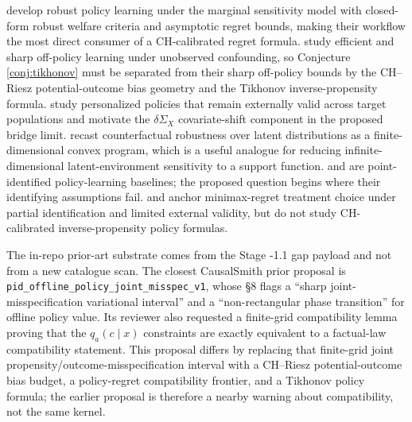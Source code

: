 \documentclass[11pt]{article}
\theoremstyle{definition}
\theoremstyle{plain}
\theoremstyle{remark}
\begin{document}
\citet{JinXuZhengZhou2025} develop robust policy learning under the marginal sensitivity model with closed-form robust welfare criteria and asymptotic regret bounds, making their workflow the most direct consumer of a CH-calibrated regret formula. \citet{HessFrauenMelnychukFeuerriegel2026} study efficient and sharp off-policy learning under unobserved confounding, so Conjecture \ref{conj:tikhonov} must be separated from their sharp off-policy bounds by the CH--Riesz potential-outcome bias geometry and the Tikhonov inverse-propensity formula. \citet{AdjahoChristensen2025} study personalized policies that remain externally valid across target populations and motivate the $\delta\Sigma_X$ covariate-shift component in the proposed bridge limit. \citet{ChristensenConnault2023} recast counterfactual robustness over latent distributions as a finite-dimensional convex program, which is a useful analogue for reducing infinite-dimensional latent-environment sensitivity to a support function. \citet{KitagawaTetenov2018} and \citet{AtheyWager2021} are point-identified policy-learning baselines; the proposed question begins where their identifying assumptions fail. \citet{Manski2004} and \citet{Stoye2012} anchor minimax-regret treatment choice under partial identification and limited external validity, but do not study CH-calibrated inverse-propensity policy formulas.

The in-repo prior-art substrate comes from the Stage -1.1 gap payload and not from a new catalogue scan. The closest CausalSmith prior proposal is \texttt{pid\_offline\_policy\_joint\_misspec\_v1}, whose \S8 flags a ``sharp joint-misspecification variational interval'' and a ``non-rectangular phase transition'' for offline policy value. Its reviewer also requested a finite-grid compatibility lemma proving that the $q_a(c\mid x)$ constraints are exactly equivalent to a factual-law compatibility statement. This proposal differs by replacing that finite-grid joint propensity/outcome-misspecification interval with a CH--Riesz potential-outcome bias budget, a policy-regret compatibility frontier, and a Tikhonov policy formula; the earlier proposal is therefore a nearby warning about compatibility, not the same kernel.
\end{document}
